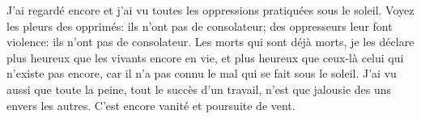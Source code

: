 J’ai regardé encore et j’ai vu toutes les oppressions pratiquées sous le soleil.
Voyez les pleurs des opprimés: ils n’ont pas de consolateur;
	des oppresseurs leur font violence: ils n’ont pas de consolateur.
Les morts qui sont déjà morts,
	je les déclare plus heureux que les vivants encore en vie,
	et plus heureux que ceux-là celui qui n’existe pas encore,
	car il n’a pas connu le mal qui se fait sous le soleil.
J’ai vu aussi que toute la peine, tout le succès d’un travail,
	n’est que jalousie des uns envers les autres.
C’est encore vanité et poursuite de vent.
